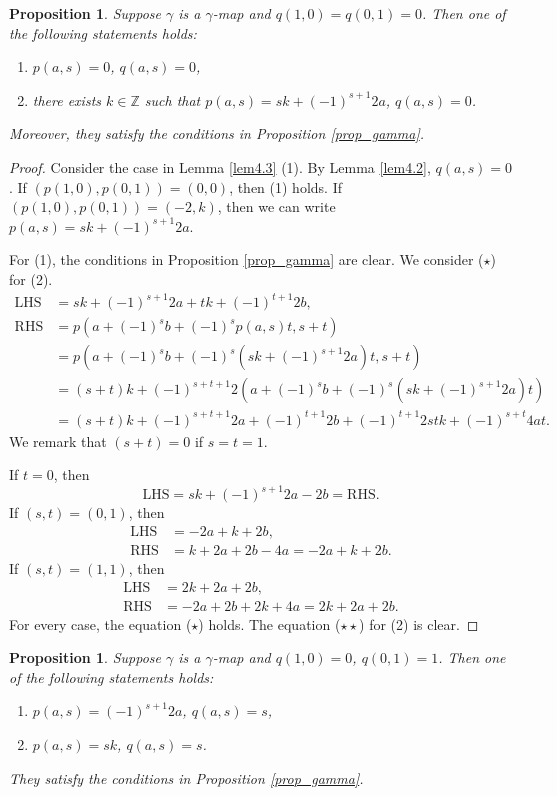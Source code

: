 \documentclass[12pt]{amsart}
\newtheorem{prop}[thm]{Proposition}
\theoremstyle{definition}
\newcommand{\Z}{\mathbb{Z}}
\begin{document}
\begin{prop}\label{prop00}
  Suppose $\gamma$ is a $\gamma$-map and $q(1,0)=q(0,1)=0$.
  Then one of the following statements holds:
  \begin{enumerate}[{\rm (1)}]
    \item $p(a,s)=0$, $q(a,s)=0$,
    \item there exists $k\in\Z$ such that
    $p(a,s)=sk+(-1)^{s+1}2a$, $q(a,s)=0$.
  \end{enumerate}
  Moreover, they satisfy the conditions in Proposition \ref{prop_gamma}.
\end{prop}

\begin{proof}
  Consider the case in Lemma \ref{lem4.3} (1).
  By Lemma \ref{lem4.2}, $q(a,s)=0$.
  If $(p(1,0),p(0,1))=(0,0)$, then (1) holds.
  If $(p(1,0),p(0,1))=(-2,k)$, then
  we can write $p(a,s)=sk+(-1)^{s+1}2a$.

  For (1),  the conditions in Proposition \ref{prop_gamma} are clear.
  We consider ($\star$) for (2).
  \begin{align*}
    \mathrm{LHS} &= sk+(-1)^{s+1}2a+tk+(-1)^{t+1}2b,\\
    \mathrm{RHS} &= p(a+(-1)^sb+(-1)^sp(a,s)t,s+t)\\
                 &= p(a+(-1)^sb+(-1)^s(sk+(-1)^{s+1}2a)t,s+t)\\
                 &= (s+t)k+(-1)^{s+t+1}2(a+(-1)^sb+(-1)^s(sk+(-1)^{s+1}2a)t)\\
                 &= (s+t)k+(-1)^{s+t+1}2a+(-1)^{t+1} 2b
                   +(-1)^{t+1}2stk+(-1)^{s+t}4at.
  \end{align*}
  We remark that $(s+t)=0$ if $s=t=1$.
  
  If $t=0$, then
  $$\mathrm{LHS} = sk+(-1)^{s+1}2a-2b= \mathrm{RHS}.$$ 
  If $(s,t)=(0,1)$, then
  \begin{align*}
    \mathrm{LHS} &= -2a+k+2b,\\
    \mathrm{RHS} &= k+2a+2b-4a = -2a+k+2b.
  \end{align*}
  If $(s,t)=(1,1)$, then
  \begin{align*}
    \mathrm{LHS} &= 2k+2a+2b,\\
    \mathrm{RHS} &= -2a+2b+2k+4a=2k+2a+2b.
  \end{align*}
  For every case, the equation ($\star$) holds.
  The equation ($\star\star$) for (2) is clear.
\end{proof}

\begin{prop}\label{prop01}
  Suppose $\gamma$ is a $\gamma$-map and $q(1,0)=0$, $q(0,1)=1$.
  Then one of the following statements holds:
  \begin{enumerate}[{\rm (1)}]
    \item $p(a,s)=(-1)^{s+1}2a$, $q(a,s)=s$,
    \item $p(a,s)=sk$, $q(a,s)=s$.
  \end{enumerate}
  They satisfy the conditions in Proposition \ref{prop_gamma}.
\end{prop}
  
\end{document}
